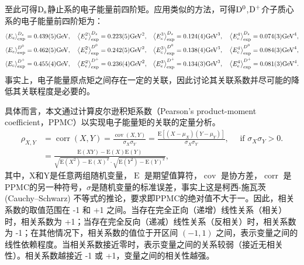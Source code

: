     至此可得$\mathrm{D_s}$静止系的电子能量前四阶矩。应用类似的方法，可得$\mathrm{D^0}$,$\mathrm{D^+}$介子质心系的电子能量前四阶矩为：
    {\scriptsize
    \begin{equation}
        \begin{aligned}
        \left\langle E_e\right\rangle_{\rm exp}^{D_{s}}=0.439(5) \mathrm{GeV}, & \quad\left\langle E_e^2\right\rangle_{\rm exp}^{D_{s}}=0.223(5) \mathrm{GeV}^2, &\left\langle E_e^3\right\rangle_{\rm exp}^{D_{s}}=0.124(4) \mathrm{GeV}^3, &\quad \left\langle E_e^4\right\rangle_{\rm exp}^{D_{s}}=0.074(3) \mathrm{GeV}^4, \\
        \left\langle E_e\right\rangle_{\rm exp}^{D^0}=0.462(5) \mathrm{GeV}, &\quad\left\langle E_e^2\right\rangle_{\rm exp}^{D^0}=0.242(5) \mathrm{GeV}^2,  &\left\langle E_e^3\right\rangle_{\rm exp}^{D^0}=0.138(4) \mathrm{GeV}^3, & \quad\left\langle E_e^4\right\rangle_{\rm exp}^{D^0}=0.084(3) \mathrm{GeV}^4, \\
        \left\langle E_e\right\rangle_{\rm exp}^{D^{+}}=0.455(4) \mathrm{GeV}, & \quad\left\langle E_e^2\right\rangle_{\rm exp}^{D^{+}}=0.236(4) \mathrm{GeV}^2, &\left\langle E_e^3\right\rangle_{\rm exp}^{D^{+}}=0.134(3) \mathrm{GeV}^3, &\quad \left\langle E_e^4\right\rangle_{\rm exp}^{D^{+}}=0.081(3) \mathrm{GeV}^4. \\
        \end{aligned}
        \label{eq:momentRest}
    \end{equation}
    }
    事实上，电子能量原点矩之间存在一定的关联，因此讨论其关联系数并尽可能的降低其关联程度是必要的。
    
    具体而言，本文通过计算皮尔逊积矩系数（Pearson's product-moment coefficient，PPMC）以实现电子能量矩的关联的定量分析。
    \begin{equation}
        \begin{aligned}
            \rho_{X, Y}&=\operatorname{corr}(X, Y)=\frac{\operatorname{cov}(X, Y)}{\sigma_X \sigma_Y}=\frac{\mathrm{E}\left[\left(X-\mu_X\right)\left(Y-\mu_Y\right)\right]}{\sigma_X \sigma_Y}, \quad \text { if } \sigma_X \sigma_Y>0 .\\
            &=\frac{\mathrm{E}(X Y)-\mathrm{E}(X) \mathrm{E}(Y)}{\sqrt{\mathrm{E}\left(X^2\right)-\mathrm{E}(X)^2} \cdot \sqrt{\mathrm{E}\left(Y^2\right)-\mathrm{E}(Y)^2}},
        \end{aligned}
        \end{equation}
        其中，X和Y是任意两组随机变量，\(\operatorname{E}\) 是期望值算符，\(\operatorname{cov}\) 是协方差，\(\operatorname{corr}\) 是PPMC的另一种符号，$\sigma$是随机变量的标准误差，事实上这是柯西-施瓦茨(Cauchy–Schwarz) 不等式的推论，要求即PPMC的绝对值不大于一。因此，相关系数的取值范围在 -1 和 +1 之间。当存在完全正向（递增）线性关系（相关）时，相关系数为 +1；当存在完全反向（递减）线性关系（反相关）时，相关系数为 -1；在其他情况下，相关系数的值位于开区间 $(-1,1)$ 之间，表示变量之间的线性依赖程度。当相关系数接近零时，表示变量之间的关系较弱（接近无相关性）。相关系数越接近 -1 或 +1，变量之间的相关性越强。

